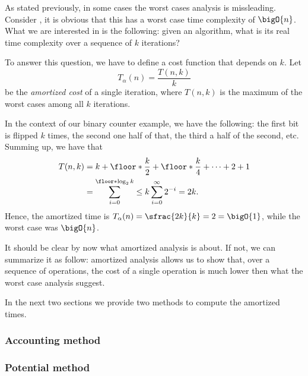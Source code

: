 \documentclass{subfiles}
\begin{document}
\label{Sec:1.2}
    As stated previously, in some cases the worst cases analysis is missleading.
        Consider , it is obvious that this has a worst case time complexity of \(\bigO{n}\).
        What we are interested in is the following: given an algorithm, what is its real time complexity 
        over a sequence of \(k\) iterations?
        

    To answer this question, we have to define a cost function that depends on \(k\).
        Let 
        \[
            T_{\alpha}(n) = \frac{T(n, k)}{k}
        \]
        be the \emph{amortized cost} of a single iteration, 
        where \(T(n, k)\) is the maximum of the worst cases among all \(k\) iterations.

    In the context of our binary counter example, we have the following: 
        the first bit is flipped \(k\) times, the second one half of that, 
        the third a half of the second, etc. Summing up, we have that 
        \[\begin{aligned}
             T(n, k) & = k + \floor*{\frac{k}{2}} + \floor*{\frac{k}{4}} + \cdots + 2 + 1 \\
                & = \sum_{i = 0}^{\floor*{\log_{2} k}} \le k \sum_{i = 0}^{\infty} 2^{-i} = 2k.
        \end{aligned}\] 
        Hence, the amortized time is \(T_{\alpha}(n) = \sfrac{2k}{k} = 2 = \bigO{1}\),
            while the worst case was \(\bigO{n}\).

    It should be clear by now what amortized analysis is about. If not, 
        we can summarize it as follow: amortized analysis allows us to show that, 
        over a sequence of operations, the cost of a single operation is much lower 
        then what the worst case analysis suggest.


    In the next two sections we provide two methods to compute the amortized times.

    \subsubsection{Accounting method}
    

    \subsubsection{Potential method}
    
    \clearpage
\end{document}

